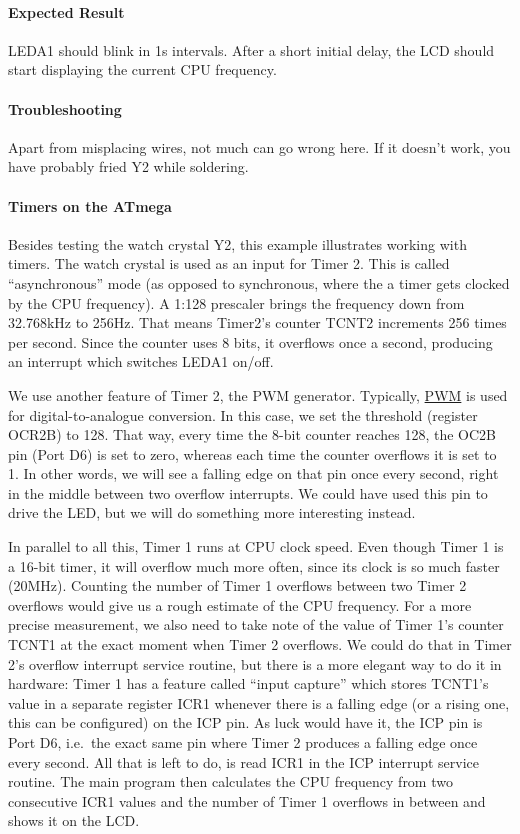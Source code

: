 \documentclass{article}
\begin{document}
\paragraph{Expected Result}
LEDA1 should blink in 1s intervals. After a short initial delay, the LCD should start displaying the current CPU frequency. 

\paragraph{Troubleshooting}
Apart from misplacing wires, not much can go wrong here. If it doesn't work, you have probably fried Y2 while soldering. 

\paragraph{Timers on the ATmega}
Besides testing the watch crystal Y2, this example illustrates working with timers. 
The watch crystal is used as an input for Timer 2. This is called ``asynchronous'' mode (as opposed to synchronous, where the a timer gets clocked by the CPU frequency). A 1:128 prescaler brings the frequency down from 32.768kHz to 256Hz. That means Timer2's counter TCNT2 increments 256 times per second. Since the counter uses 8 bits, it overflows once a second, producing an interrupt which switches LEDA1 on/off. 

We use another feature of Timer 2, the PWM generator. Typically, \href{https://en.wikipedia.org/wiki/Pulse-width_modulation}{PWM} is used for digital-to-analogue conversion. In this case, we set the threshold (register OCR2B) to 128. That way, every time the 8-bit counter reaches 128, the OC2B pin (Port D6) is set to zero, whereas each time the counter overflows it is set to 1. In other words, we will see a falling edge on that pin once every second, right in the middle between two overflow interrupts. We could have used this pin to drive the LED, but we will do something more interesting instead. 

In parallel to all this, Timer 1 runs at CPU clock speed. Even though Timer 1 is a 16-bit timer, it will overflow much more often, since its clock is so much faster (20MHz). Counting the number of Timer 1 overflows between two Timer 2 overflows would give us a rough estimate of the CPU frequency. For a more precise measurement, we also need to take note of the value of Timer 1's counter TCNT1 at the exact moment when Timer 2 overflows. We could do that in Timer 2's overflow interrupt service routine, but there is a more elegant way to do it in hardware: Timer 1 has a feature called ``input capture'' which stores TCNT1's value in a separate register ICR1 whenever there is a falling edge (or a rising one, this can be configured) on the ICP pin. As luck would have it, the ICP pin is Port D6, i.e.\ the exact same pin where Timer 2 produces a falling edge once every second. All that is left to do, is read ICR1 in the ICP interrupt service routine. The main program then calculates the CPU frequency from two consecutive ICR1 values and the number of Timer 1 overflows in between and shows it on the LCD. 
\end{document}

